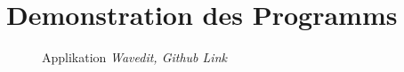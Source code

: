 \section{Demonstration des Programms}
\begin{frame}{\insertsection}
	\begin{figure}
		\caption*{Applikation \it{Wavedit}, Github Link}
	\end{figure}
\end{frame}
